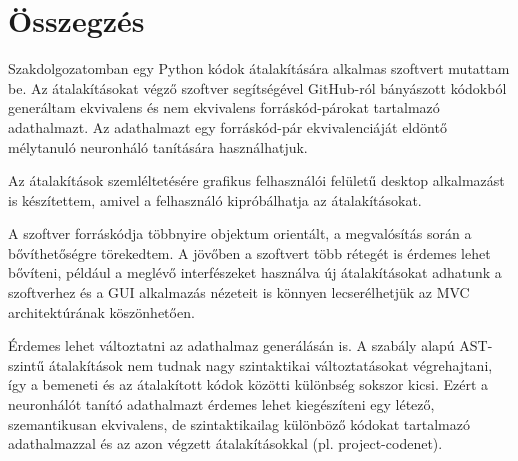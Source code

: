 \chapter{Összegzés}
\label{ch:sum}

Szakdolgozatomban egy Python kódok átalakítására alkalmas szoftvert mutattam be.
Az átalakításokat végző szoftver segítségével GitHub-ról bányászott kódokból generáltam
ekvivalens és nem ekvivalens forráskód-párokat tartalmazó adathalmazt.
Az adathalmazt egy forráskód-pár ekvivalenciáját eldöntő mélytanuló neuronháló tanítására használhatjuk.

Az átalakítások szemléltetésére grafikus felhasználói felületű desktop alkalmazást is készítettem,
amivel a felhasználó kipróbálhatja az átalakításokat.

A szoftver forráskódja többnyire objektum orientált,
a megvalósítás során a bővíthetőségre törekedtem.
A jövőben a szoftvert több rétegét is érdemes lehet bővíteni,
például a meglévő interfészeket használva új átalakításokat adhatunk a szoftverhez és
a GUI alkalmazás nézeteit is könnyen lecserélhetjük az MVC architektúrának köszönhetően.

Érdemes lehet változtatni az adathalmaz generálásán is. 
A szabály alapú AST-szintű átalakítások nem tudnak nagy szintaktikai változtatásokat végrehajtani,
így a bemeneti és az átalakított kódok közötti különbség sokszor kicsi.
Ezért a neuronhálót tanító adathalmazt érdemes lehet kiegészíteni egy létező,
szemantikusan ekvivalens, de szintaktikailag különböző kódokat 
tartalmazó adathalmazzal és az azon végzett átalakításokkal (pl. project-codenet).
